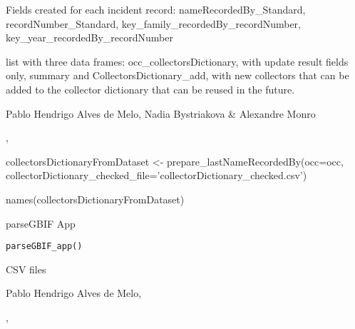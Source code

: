 \documentclass[a4paper]{book}
\begin{document}
%
\begin{Details}
Fields created for each incident record:
nameRecordedBy\_Standard,
recordNumber\_Standard,
key\_family\_recordedBy\_recordNumber,
key\_year\_recordedBy\_recordNumber
\end{Details}
%
\begin{Value}
list with three data frames:
occ\_collectorsDictionary, with update result fields only,
summary and
CollectorsDictionary\_add, with new collectors that can be added to the
collector dictionary that can be reused in the future.
\end{Value}
%
\begin{Author}
Pablo Hendrigo Alves de Melo,
Nadia Bystriakova \&
Alexandre Monro
\end{Author}
%
\begin{SeeAlso}
, 
\end{SeeAlso}
%
\begin{Examples}
\begin{ExampleCode}

collectorsDictionaryFromDataset <- prepare_lastNameRecordedBy(occ=occ,
                                                              collectorDictionary_checked_file='collectorDictionary_checked.csv')

names(collectorsDictionaryFromDataset)



\end{ExampleCode}
\end{Examples}
%
\begin{Description}
parseGBIF App
\end{Description}
%
\begin{Usage}
\begin{verbatim}
parseGBIF_app()
\end{verbatim}
\end{Usage}
%
\begin{Value}
CSV files
\end{Value}
%
\begin{Author}
Pablo Hendrigo Alves de Melo,
\end{Author}
%
\begin{SeeAlso}
, 
\end{SeeAlso}
\end{document}
